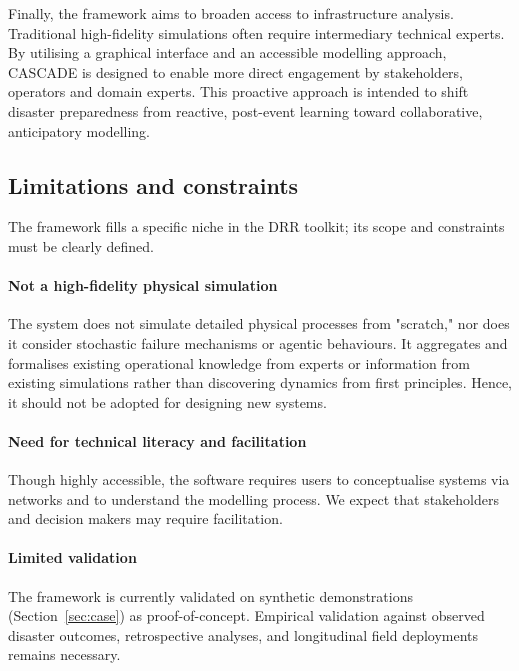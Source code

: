 \documentclass[review,12pt]{elsarticle}
\begin{document}
Finally, the framework aims to broaden access to infrastructure analysis. Traditional high-fidelity simulations often require intermediary technical experts. By utilising a graphical interface and an accessible modelling approach, CASCADE is designed to enable more direct engagement by stakeholders, operators and domain experts. This proactive approach is intended to shift disaster preparedness from reactive, post-event learning toward collaborative, anticipatory modelling.



\subsection{Limitations and constraints}
\label{subsec:limitations}
The framework fills a specific niche in the DRR toolkit; its scope and constraints must be clearly defined.

\paragraph{Not a high-fidelity physical simulation}
The system does not simulate detailed physical processes from "scratch," nor does it consider stochastic failure mechanisms or agentic behaviours. It aggregates and formalises existing operational knowledge from experts or information from existing simulations rather than discovering dynamics from first principles. Hence, it should not be adopted for designing new systems.


\paragraph{Need for technical literacy and facilitation}
Though highly accessible, the software requires users to conceptualise systems via networks and to understand the modelling process. We expect that stakeholders and decision makers may require facilitation.

\paragraph{Limited validation}
The framework is currently validated on synthetic demonstrations (Section~\ref{sec:case}) as proof-of-concept. Empirical validation against observed disaster outcomes, retrospective analyses, and longitudinal field deployments remains necessary.

\end{document}
